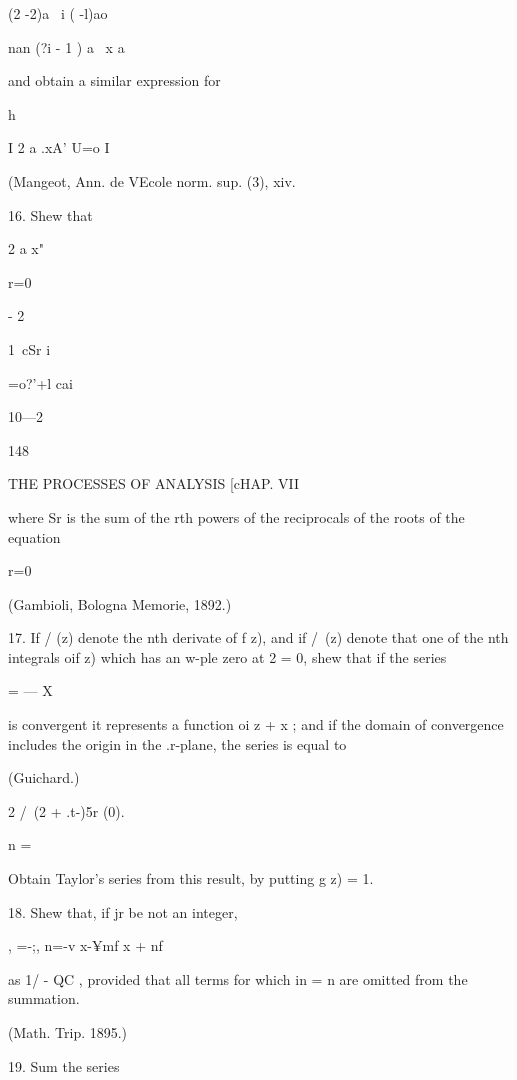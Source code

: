 {{(2 -2)a \ i ( -l)ao

nan (?i - 1 ) a \ x a

and obtain a similar expression for

h



I 2 a .xA' U=o I

(Mangeot, Ann. de VEcole norm. sup. (3), xiv.



16. Shew that



2 a x"

r=0



- 2



1\ cSr i

=o?'+l cai



10—2



148



THE PROCESSES OF ANALYSIS [cHAP. VII



where Sr is the sum of the rth powers of the reciprocals of the roots
of the equation

r=0

(Gambioli, Bologna Memorie, 1892.)

17. If / (z) denote the nth derivate of f z), and if /\ (z) denote
that one of the nth integrals oif z) which has an w-ple zero at 2 = 0,
shew that if the series

  = — X

is convergent it represents a function oi z + x ; and if the domain of
convergence includes the origin in the .r-plane, the series is equal
to



(Guichard.)



2 /\ (2 + .t-)5r (0).

n =

Obtain Taylor's series from this result, by putting g z) = 1.

18. Shew that, if jr be not an integer,

, =-;, n=-v x-¥mf x + nf

as 1/ - QC , provided that all terms for which in = n are omitted from
the summation.

(Math. Trip. 1895.)

19. Sum the series

}}
